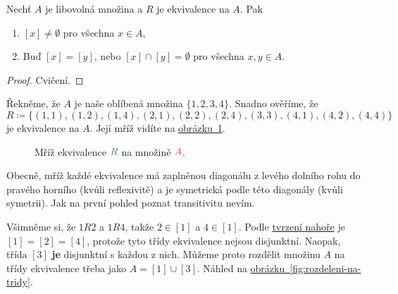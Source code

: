 \begin{claim}
 \label{claim:vlastnosti-trid-ekvivalence}
 Nechť $A$ je libovolná množina a $R$ je ekvivalence na $A$. Pak
 \begin{enumerate}
  \item $[x] \neq \emptyset$ pro všechna $x \in A$,
  \item Buď $[x] = [y]$, nebo $[x] \cap [y] = \emptyset$ pro všechna $x,y \in
   A$.
 \end{enumerate}
\end{claim}
\begin{proof}
 Cvičení.
\end{proof}

\begin{example}
 Řekněme, že $A$ je naše oblíbená množina $\{1,2,3,4\}$. Snadno ověříme, že
 \[
  R \coloneqq \{(1,1),(1,2),(1,4),(2,1),(2,2),(2,4),(3,3),(4,1),(4,2),(4,4)\}
 \]
 je ekvivalence na $A$. Její mříž vidíte na
 \hyperref[fig:mriz-ekvivalence]{obrázku~\ref*{fig:mriz-ekvivalence}}.
 \begin{figure}[H]
  \centering
  \caption{Mříž ekvivalence $\clg{R}$ na množině $\clr{A}$.}
  \label{fig:mriz-ekvivalence}
 \end{figure}
 Obecně, mříž každé ekvivalence má zaplněnou diagonálu z levého dolního rohu do
 pravého horního (kvůli reflexivitě) a je symetrická podle této diagonály (kvůli
 symetrii). Jak na první pohled poznat transitivitu nevím.

 Všimněme si, že $1R2$ a $1R4$, takže $2 \in [1]$ a $4 \in [1]$. Podle
 \hyperref[claim:vlastnosti-trid-ekvivalence]{tvrzení nahoře} je $[1] = [2] =
 [4]$, protože tyto třídy ekvivalence nejsou disjunktní. Naopak, třída $[3]$
 \textbf{je} disjunktní s každou z nich. Můžeme proto rozdělit množinu $A$ na
 třídy ekvivalence třeba jako $A = [1] \cup [3]$. Náhled na
 \hyperref[fig:rozdeleni-na-tridy]{obrázku~\ref*{fig:rozdeleni-na-tridy}}.
 \begin{figure}[H]
  \centering
\end{figure}
\end{example}
